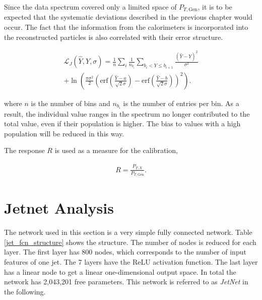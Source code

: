 \documentclass[12pt, a4paper]{thesis}
\begin{document}
Since the data spectrum covered only a limited space of \(P_{T,
  \text{Gen}}\), it is to be expected that the systematic deviations
described in the previous chapter would occur. The fact that the
information from the calorimeters is incorporated into the
reconstructed particles is also correlated with their error structure.


\begin{align}
  \mathcal{L}_{J}(\hat Y, Y, \sigma) = \frac{1}{n}
  \sum_{i} \frac{1}{n_{b_i} } \sum_{b_i < Y \leq b_{i+1}} \frac{(\hat
    Y -Y)^2}{\sigma^2} \nonumber \\ +
  \ln(\frac{\pi\sigma^2}{2}\left(\text{erf}\left(\frac{\hat Y-a}{\sqrt{2}\sigma}\right)
  - \text{erf}\left(\frac{\hat Y-b}{\sqrt{2}\sigma}\right)\right)^2).
\end{align}

where $n$ is the number of bins and $n_{b_i}$ is the number of entries
per bin.   As a result, the individual value ranges in
the spectrum no longer contributed to the total value, even if their
population is higher. The bias to values with a high population will
be reduced in this way.

The response \(R\) is used as a measure for the calibration,

\begin{align}
R = \frac{P_{T, X}}{P_{T, \text{Gen}}}.
\end{align}


\clearpage
\section{Jetnet Analysis}
\label{sec:org03235a3}

The network used in this section is a very simple fully connected
network.  Table \ref{jet_fcn_structure} shows the structure. The
number of nodes is reduced for each layer.  The first layer has 800
nodes, which corresponds to the number of input features of one
jet. The 7 layers have the ReLU activation function. The last layer
has a linear node to get a linear one-dimensional output space. In
total the network has 2,043,201 free parameters. This network is
referred to as \emph{JetNet} in the following.
\end{document}
